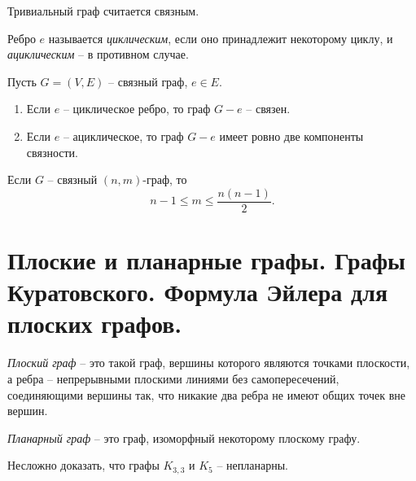 \begin{remark}
    Тривиальный граф считается связным.
\end{remark}

\begin{definition}
    Ребро $ e $ называется \emph{циклическим}, если оно принадлежит некоторому циклу, и \emph{ациклическим} -- в противном случае.
\end{definition}

\begin{lemma}
    Пусть $ G = (V,E) $ -- связный граф, $ e \in E $.
    \begin{enumerate}
        \item Если $ e $ -- циклическое ребро, то граф $ G - e $ -- связен.
        \item Если $ e $ -- ациклическое, то граф $ G - e $ имеет ровно две компоненты связности.
    \end{enumerate}
\end{lemma}

\begin{theorem}\label{theorem:1}
    Если $ G $ -- связный $ (n,m) $-граф, то
    \[
        n-1 \leqslant m \leqslant \frac{n(n-1)}{2}.
    \]
\end{theorem}

\section{Плоские и планарные графы. Графы Куратовского. Формула Эйлера для плоских графов.}

\begin{definition}
    \emph{Плоский граф} -- это такой граф, вершины которого являются точками плоскости, а ребра -- непрерывными плоскими линиями без самопересечений, соединяющими вершины так, что никакие два ребра не имеют общих точек вне вершин.

    \emph{Планарный граф} -- это граф, изоморфный некоторому плоскому графу.
    \begin{figure}[H]
        \centering
        \label{fig:fig_23}
    \end{figure}
\end{definition}

\begin{remark}
    Несложно доказать, что графы $ K_{3,3} $ и $ K_5 $ -- непланарны.
    \begin{figure}[H]
        \centering
        \label{fig:fig_24}
    \end{figure}
\end{remark}


